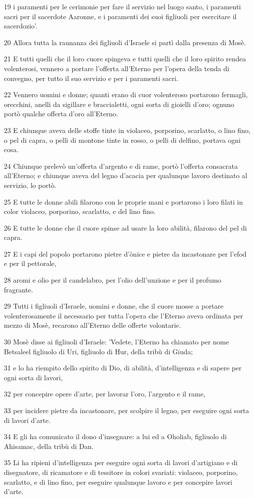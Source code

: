 \par 19 i paramenti per le cerimonie per fare il servizio nel luogo santo, i paramenti sacri per il sacerdote Aaronne, e i paramenti dei suoi figliuoli per esercitare il sacerdozio'.
\par 20 Allora tutta la raunanza dei figliuoli d'Israele si partì dalla presenza di Mosè.
\par 21 E tutti quelli che il loro cuore spingeva e tutti quelli che il loro spirito rendea volenterosi, vennero a portare l'offerta all'Eterno per l'opera della tenda di convegno, per tutto il suo servizio e per i paramenti sacri.
\par 22 Vennero uomini e donne; quanti erano di cuor volenteroso portarono fermagli, orecchini, anelli da sigillare e braccialetti, ogni sorta di gioielli d'oro; ognuno portò qualche offerta d'oro all'Eterno.
\par 23 E chiunque aveva delle stoffe tinte in violaceo, porporino, scarlatto, o lino fino, o pel di capra, o pelli di montone tinte in rosso, o pelli di delfino, portava ogni cosa.
\par 24 Chiunque prelevò un'offerta d'argento e di rame, portò l'offerta consacrata all'Eterno; e chiunque aveva del legno d'acacia per qualunque lavoro destinato al servizio, lo portò.
\par 25 E tutte le donne abili filarono con le proprie mani e portarono i loro filati in color violaceo, porporino, scarlatto, e del lino fino.
\par 26 E tutte le donne che il cuore spinse ad usare la loro abilità, filarono del pel di capra.
\par 27 E i capi del popolo portarono pietre d'ònice e pietre da incastonare per l'efod e per il pettorale,
\par 28 aromi e olio per il candelabro, per l'olio dell'unzione e per il profumo fragrante.
\par 29 Tutti i figliuoli d'Israele, uomini e donne, che il cuore mosse a portare volenterosamente il necessario per tutta l'opera che l'Eterno aveva ordinata per mezzo di Mosè, recarono all'Eterno delle offerte volontarie.
\par 30 Mosè disse ai figliuoli d'Israele: 'Vedete, l'Eterno ha chiamato per nome Betsaleel figliuolo di Uri, figliuolo di Hur, della tribù di Giuda;
\par 31 e lo ha riempito dello spirito di Dio, di abilità, d'intelligenza e di sapere per ogni sorta di lavori,
\par 32 per concepire opere d'arte, per lavorar l'oro, l'argento e il rame,
\par 33 per incidere pietre da incastonare, per scolpire il legno, per eseguire ogni sorta di lavori d'arte.
\par 34 E gli ha comunicato il dono d'insegnare: a lui ed a Oholiab, figliuolo di Ahisamac, della tribù di Dan.
\par 35 Li ha ripieni d'intelligenza per eseguire ogni sorta di lavori d'artigiano e di disegnatore, di ricamatore e di tessitore in colori svariati: violaceo, porporino, scarlatto, e di lino fino, per eseguire qualunque lavoro e per concepire lavori d'arte.

